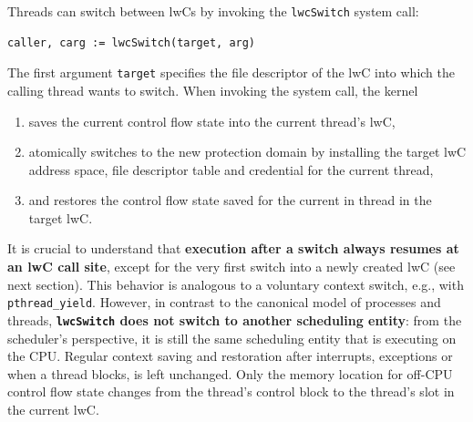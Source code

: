 \documentclass[10pt,twocolumn,a4paper]{article}
\begin{document}
Threads can switch between lwCs by invoking the \lstinline{lwcSwitch} system call:

\begin{lstlisting}[style=syscallinline]
  caller, carg := lwcSwitch(target, arg) 
\end{lstlisting}

The first argument \lstinline{target} specifies the file descriptor of the lwC into which the calling thread wants to switch.
When invoking the system call, the kernel
\begin{enumerate}[nosep,label=(\alph*)]
\item saves the current control flow state into the current thread's lwC,
\item atomically switches to the new protection domain by installing the target lwC address space, file descriptor table and credential for the current thread,
\item and restores the control flow state saved for the current in thread in the target lwC.
\end{enumerate}
\cite{lwckernelrepo,lwcpaper}


It is crucial to understand that \textbf{execution after a switch always resumes at an lwC call site}, except for the very first switch into a newly created lwC (see next section).
This behavior is analogous to a voluntary context switch, e.g., with \lstinline{pthread_yield}.
However, in contrast to the canonical model of processes and threads, \textbf{\lstinline{lwcSwitch} does not switch to another scheduling entity}:
from the scheduler's perspective, it is still the same scheduling entity that is executing on the CPU.
Regular context saving and restoration after interrupts, exceptions or when a thread blocks, is left unchanged.
Only the memory location for off-CPU control flow state changes from the thread's control block to the thread's slot in the current lwC.
\cite{lwckernelrepo}
\end{document}
